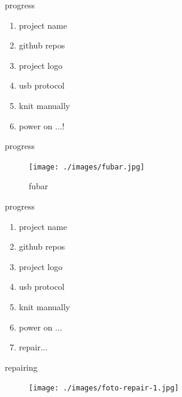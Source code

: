 \begin{frame}{progress}
    \begin{enumerate}
        \item project name \pause \emojiCheck \pause
        \item github repos \pause \emojiCheck \pause
        \item project logo \pause \emojiCheck \pause
        \item usb protocol \pause \emojiCheck \pause
        \item knit manually \pause \emojiCheck \pause
        \item power on ...! \pause
    \end{enumerate}

    \center
     \pause %
     \pause %
     \pause %
     \pause %
\end{frame}


\begin{frame}{progress}
    \begin{figure}
        \texttt{[image: ./images/fubar.jpg]}
        \caption{fubar}
    \end{figure}
\end{frame}

\begin{frame}{progress}
    \begin{enumerate}
        \item project name \emojiCheck
        \item github repos \emojiCheck
        \item project logo \emojiCheck
        \item usb protocol \emojiCheck
        \item knit manually \emojiCheck
        \item power on ... \emojiFail \pause
        \item repair...
    \end{enumerate}
\end{frame}

\begin{frame}{repairing}
    \begin{figure}
        \texttt{[image: ./images/foto-repair-1.jpg]}
    \end{figure}
\end{frame}

